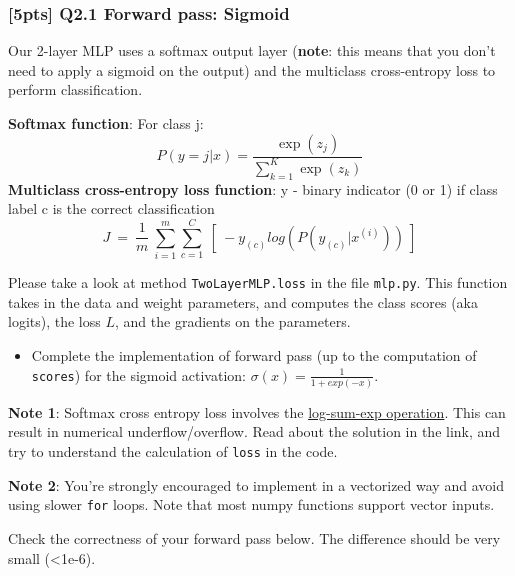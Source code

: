 \documentclass[11pt]{article}
\providecommand{\tightlist}{%
      \setlength{\itemsep}{0pt}\setlength{\parskip}{0pt}}
\begin{document}
    \hypertarget{pts-q2.1-forward-pass-sigmoid}{%
\subsubsection{{[}5pts{]} Q2.1 Forward pass:
Sigmoid}\label{pts-q2.1-forward-pass-sigmoid}}

Our 2-layer MLP uses a softmax output layer (\textbf{note}: this means
that you don't need to apply a sigmoid on the output) and the multiclass
cross-entropy loss to perform classification.

\textbf{Softmax function}: For class j:
\[P(y=j|x) = \frac{\exp(z_j)}{\sum_{k=1}^{K} \exp(z_k)}\]
\textbf{Multiclass cross-entropy loss function}: y - binary indicator (0
or 1) if class label c is the correct classification\\
\[J \ = \ \frac{1}{m} \ \sum_{i=1}^{m} \sum_{c=1}^{C} \ [ \ -y_{(c)} log(P(y_{(c)}|x^{(i)})) \ ]\]

Please take a look at method \texttt{TwoLayerMLP.loss} in the file
\texttt{mlp.py}. This function takes in the data and weight parameters,
and computes the class scores (aka logits), the loss \(L\), and the
gradients on the parameters.

\begin{itemize}
\tightlist
\item
  Complete the implementation of forward pass (up to the computation of
  \texttt{scores}) for the sigmoid activation:
  \(\sigma(x)=\frac{1}{1+exp(-x)}\).
\end{itemize}

\textbf{Note 1}: Softmax cross entropy loss involves the
\href{https://en.wikipedia.org/wiki/LogSumExp}{log-sum-exp operation}.
This can result in numerical underflow/overflow. Read about the solution
in the link, and try to understand the calculation of \texttt{loss} in
the code.

\textbf{Note 2}: You're strongly encouraged to implement in a vectorized
way and avoid using slower \texttt{for} loops. Note that most numpy
functions support vector inputs.

Check the correctness of your forward pass below. The difference should
be very small (\textless{}1e-6).
\end{document}
